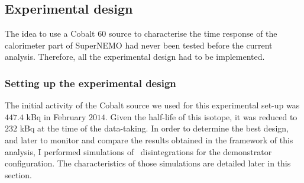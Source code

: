 \subsection{Experimental design}
\label{subsec:Co_setup}


The idea to use a Cobalt $60$ source to characterise the time response of the calorimeter part of SuperNEMO had never been tested before the current analysis.
Therefore, all the experimental design had to be implemented.


\subsubsection*{Setting up the experimental design}


The initial activity of the Cobalt source we used for this experimental set-up was $447.4$ kBq in February $2014$.
Given the half-life of this isotope, it was reduced to $232$ kBq at the time of the data-taking.
In order to determine the best design, and later to monitor and compare the results obtained in the framework of this analysis, I performed simulations of \Co\ disintegrations for the demonstrator configuration.
The characteristics of those simulations are detailed later in this section.

